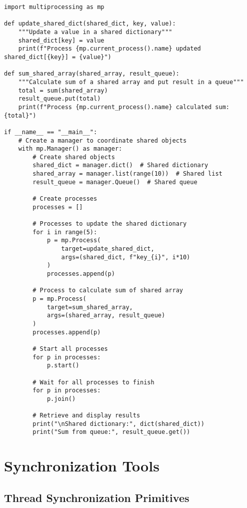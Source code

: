\documentclass[12pt,letterpaper]{article}
\newenvironment{macterminal}{%
    \begin{mdframed}[
        linecolor=terminalFrame,
        backgroundcolor=terminalBg,
        roundcorner=5pt,
        skipabove=10pt,
        skipbelow=10pt,
        linewidth=1pt,
        innertopmargin=10pt, %
        frametitle={%
            \tikz[baseline=(current bounding box.east), outer sep=0pt]{
                \fill[red!80!black] (0,0) circle (5pt);
                \fill[yellow!80!black] (0.7,0) circle (5pt);
                \fill[green!70!black] (1.4,0) circle (5pt);
            }
        },
        frametitlealignment=\raggedright, %
        frametitleaboveskip=8pt, %
        frametitlebelowskip=0pt, %
    ]
}{%
    \end{mdframed}%
}
\begin{document}
\begin{macterminal}
\begin{lstlisting}
import multiprocessing as mp

def update_shared_dict(shared_dict, key, value):
    """Update a value in a shared dictionary"""
    shared_dict[key] = value
    print(f"Process {mp.current_process().name} updated shared_dict[{key}] = {value}")

def sum_shared_array(shared_array, result_queue):
    """Calculate sum of a shared array and put result in a queue"""
    total = sum(shared_array)
    result_queue.put(total)
    print(f"Process {mp.current_process().name} calculated sum: {total}")

if __name__ == "__main__":
    # Create a manager to coordinate shared objects
    with mp.Manager() as manager:
        # Create shared objects
        shared_dict = manager.dict()  # Shared dictionary
        shared_array = manager.list(range(10))  # Shared list
        result_queue = manager.Queue()  # Shared queue
        
        # Create processes
        processes = []
        
        # Processes to update the shared dictionary
        for i in range(5):
            p = mp.Process(
                target=update_shared_dict,
                args=(shared_dict, f"key_{i}", i*10)
            )
            processes.append(p)
        
        # Process to calculate sum of shared array
        p = mp.Process(
            target=sum_shared_array,
            args=(shared_array, result_queue)
        )
        processes.append(p)
        
        # Start all processes
        for p in processes:
            p.start()
            
        # Wait for all processes to finish
        for p in processes:
            p.join()
        
        # Retrieve and display results
        print("\nShared dictionary:", dict(shared_dict))
        print("Sum from queue:", result_queue.get())
\end{lstlisting}
\end{macterminal}

\section{Synchronization Tools}

\subsection{Thread Synchronization Primitives}
\end{document}

